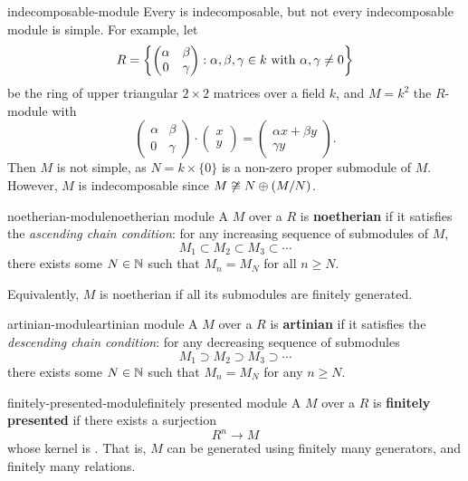 \begin{example}{indecomposable-module}
    Every  is indecomposable, but not every indecomposable module is simple. For example, let
    \[ R = \left\{ \begin{pmatrix} \alpha & \beta \\ 0 & \gamma \end{pmatrix} : \alpha, \beta, \gamma \in k \textup{ with } \alpha, \gamma \ne 0 \right\} \]
    be the ring of upper triangular $2 \times 2$ matrices over a field $k$, and $M = k^2$ the $R$-module with
    \[ \begin{pmatrix} \alpha & \beta \\ 0 & \gamma \end{pmatrix} \cdot \begin{pmatrix} x \\ y \end{pmatrix} = \begin{pmatrix} \alpha x + \beta y \\ \gamma y \end{pmatrix} . \]
    Then $M$ is not simple, as $N = k \times \{ 0 \}$ is a non-zero proper submodule of $M$. However, $M$ is indecomposable since $M \not\cong N \oplus (M / N)$.
\end{example}

\begin{topic}{noetherian-module}{noetherian module}
    A  $M$ over a  $R$ is \textbf{noetherian} if it satisfies the \textit{ascending chain condition}: for any increasing sequence of submodules of $M$,
    \[ M_1 \subset M_2 \subset M_3 \subset \cdots \]
    there exists some $N \in \mathbb{N}$ such that $M_n = M_N$ for all $n \ge N$.
    
    Equivalently, $M$ is noetherian if all its submodules are finitely generated.
\end{topic}

\begin{topic}{artinian-module}{artinian module}
    A  $M$ over a  $R$ is \textbf{artinian} if it satisfies the \textit{descending chain condition}: for any decreasing sequence of submodules
    \[ M_1 \supset M_2 \supset M_3 \supset \cdots \]
    there exists some $N \in \mathbb{N}$ such that $M_n = M_N$ for any $n \ge N$.
\end{topic}

\begin{topic}{finitely-presented-module}{finitely presented module}
    A  $M$ over a  $R$ is \textbf{finitely presented} if there exists a surjection
    \[ R^n \to M \]
    whose kernel is . That is, $M$ can be generated using finitely many generators, and finitely many relations.
\end{topic}

